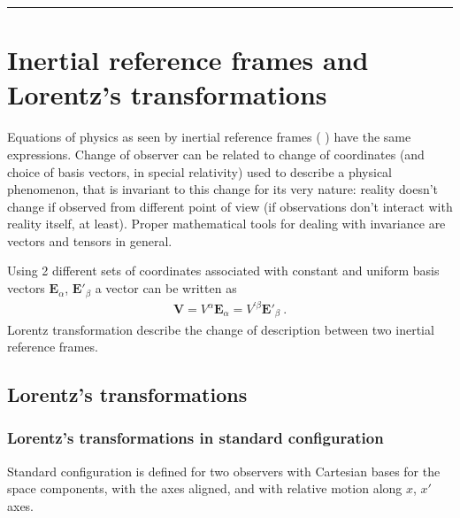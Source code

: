\documentclass[letterpaper,10pt,english]{jupyterBook}
\begin{document}
\bigskip\hrule\bigskip


\sphinxstepscope


\chapter{Inertial reference frames and Lorentz’s transformations}
\label{\detokenize{ch/relativity-special/lorentz:inertial-reference-frames-and-lorentz-s-transformations}}\label{\detokenize{ch/relativity-special/lorentz:relativity-special-lorentz}}\label{\detokenize{ch/relativity-special/lorentz::doc}}
\sphinxAtStartPar
Equations of physics as seen by inertial reference frames ( ) have the same expressions. Change of observer can be related to change of coordinates (and choice of basis vectors, in special relativity) used to describe a physical phenomenon, that is invariant to this change for its very nature: reality doesn’t change if observed from different point of view (if observations don’t interact with reality itself, at least). Proper mathematical tools for dealing with invariance are vectors and tensors in general.

\sphinxAtStartPar
Using 2 different sets of coordinates associated with constant and uniform basis vectors \(\mathbf{E}_{\alpha}\), \(\mathbf{E}'_{\beta}\) a vector can be written as
\begin{equation*}
\begin{split}\mathbf{V} = V^{\alpha} \mathbf{E}_{\alpha} = V^{'\beta} \mathbf{E}'_{\beta} \ . \end{split}
\end{equation*}
\sphinxAtStartPar
Lorentz transformation describe the change of description between two inertial reference frames.


\section{Lorentz’s transformations}
\label{\detokenize{ch/relativity-special/lorentz:lorentz-s-transformations}}\label{\detokenize{ch/relativity-special/lorentz:relativity-special-lorentz-transformation}}

\subsection{Lorentz’s transformations in standard configuration}
\label{\detokenize{ch/relativity-special/lorentz:lorentz-s-transformations-in-standard-configuration}}\label{\detokenize{ch/relativity-special/lorentz:relativity-special-lorentz-transformation-std}}
\sphinxAtStartPar
Standard configuration is defined for two observers with Cartesian bases for the space components, with the axes aligned, and with relative motion along \(x\), \(x'\) axes.
\end{document}
